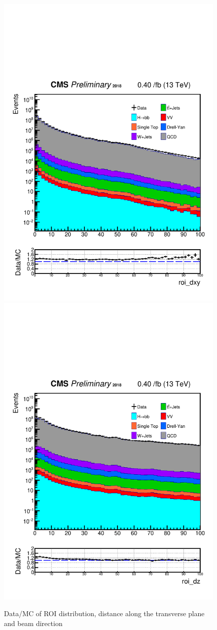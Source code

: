 \begin{figure}[h!]
  \caption{Data/MC of ROI distribution, distance along the transverse plane and beam direction}
  \label{fig:ROIs}
  \centering
  \includegraphics[width=0.47\linewidth]{figs/Data_AnalysisNoteplot_MS-15_ctauS-10_roi_dxy.pdf}
  \includegraphics[width=0.47\linewidth]{figs/Data_AnalysisNoteplot_MS-15_ctauS-10_roi_dz.pdf}
\end{figure}

